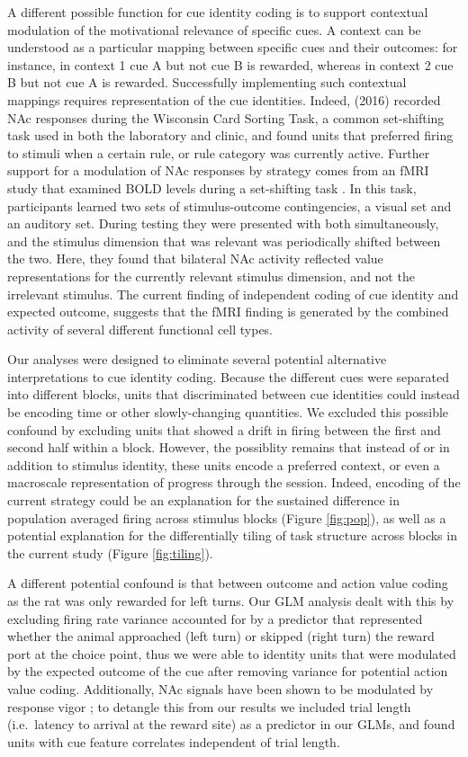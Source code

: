 \documentclass[11pt]{article}
\let\cite=\citep
\begin{document}
A different possible function for cue identity coding is to support
contextual modulation of the motivational relevance of specific
cues. A context can be understood as a particular mapping between
specific cues and their outcomes: for instance, in context 1 cue A but
not cue B is rewarded, whereas in context 2 cue B but not cue A is
rewarded. Successfully implementing such contextual mappings requires
representation of the cue identities. Indeed, \citeauthor{Sleezer2016} (2016)
recorded NAc responses during the Wisconsin Card Sorting Task,
a common set-shifting task used in both the laboratory and clinic, and
found units that preferred firing to stimuli when a certain rule, or
rule category was currently active. Further support for a
modulation of NAc responses by strategy comes from an fMRI study that
examined BOLD levels during a set-shifting task
\cite{Fitzgerald2014}. In this task, participants learned two sets of
stimulus-outcome contingencies, a visual set and an auditory set. During
testing they were presented with both simultaneously, and the stimulus
dimension that was relevant was periodically shifted between the
two. Here, they found that bilateral NAc activity reflected value
representations for the currently relevant stimulus dimension, and not
the irrelevant stimulus. The current finding of independent coding of cue identity and expected
outcome, suggests that the fMRI finding is generated by the combined
activity of several different functional cell types.

Our analyses were designed to eliminate several potential alternative
interpretations to cue identity coding. Because the different cues
were separated into different blocks, units that discriminated between
cue identities could instead be encoding time or other slowly-changing
quantities. We excluded this possible confound by excluding units that
showed a drift in firing between the first and second half within a
block. However, the possiblity remains that instead of or in addition
to stimulus identity, these units encode a preferred context, or even
a macroscale representation of progress through the session. Indeed,
encoding of the current strategy could be an explanation for the
sustained difference in population averaged firing across stimulus
blocks (Figure \ref{fig:pop}), as well as a potential explanation for
the differentially tiling of task structure across blocks in the
current study (Figure \ref{fig:tiling}).

A different potential confound is that between outcome and action
value coding as the rat was only rewarded for left turns. Our GLM
analysis dealt with this by excluding firing rate variance accounted
for by a predictor that represented whether the animal approached
(left turn) or skipped (right turn) the reward port at the choice
point, thus we were able to identity units that were modulated by the
expected outcome of the cue after removing variance for potential
action value coding. Additionally, NAc signals have been shown to be
modulated by response vigor \cite{McGinty2013}; to detangle this from
our results we included trial length (i.e.\ latency to arrival at the
reward site) as a predictor in our GLMs, and found units with cue
feature correlates independent of trial length.
\end{document}
